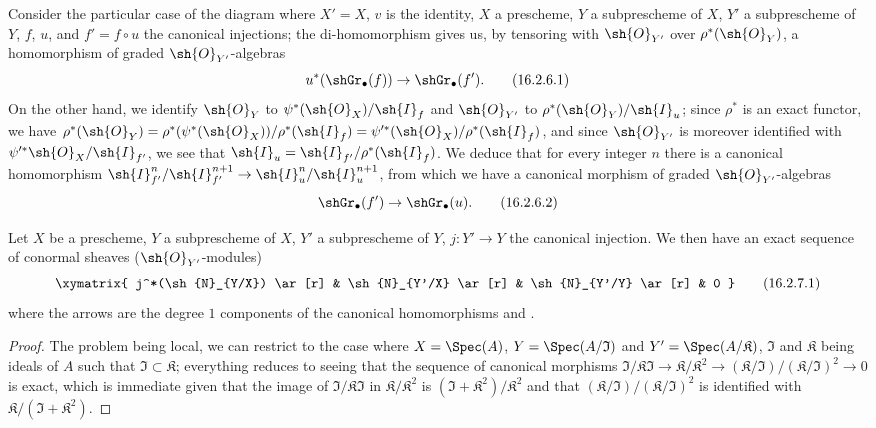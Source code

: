 \begin{env}[16.2.6]
\label{IV.16.2.6}
Consider the particular case of the diagram  where $X' = X$, $v$ is the identity, $X$ a prescheme, $Y$ a subprescheme of $X$, $Y'$ a subprescheme of $Y$, $f$, $u$, and $f' = f \circ u$ the canonical injections;
the di-homomorphism  gives us, by tensoring with $\sh{O}_{Y'}$ over $\rho^*(\sh{O}_Y)$, a homomorphism of graded $\sh{O}_{Y'}$-algebras
\[
  \label{IV.16.2.6.1}
  u^*(\shGr_\bullet(f)) \to \shGr_\bullet(f').
  \tag{16.2.6.1}
\]
On the other hand, we identify $\sh{O}_Y$ to $\psi^*(\sh{O}_X)/\sh{I}_f$ and $\sh{O}_{Y'}$ to $\rho^*(\sh{O}_Y)/\sh{I}_u$;
since $\rho^*$ is an exact functor, we have $\rho^*(\sh{O}_Y) = \rho^*(\psi^*(\sh{O}_X))/\rho^*(\sh{I}_f) = \psi'^*(\sh{O}_X)/\rho^*(\sh{I}_f)$, and since $\sh{O}_{Y'}$ is moreover identified with $\psi'^*{\sh{O}_X}/\sh{I}_{f'}$, we see that $\sh{I}_u = \sh{I}_{f'}/\rho^*(\sh{I}_f)$.
We deduce that for every integer $n$ there is a canonical homomorphism $\sh{I}_{f'}^n/\sh{I}_{f'}^{n+1} \to \sh{I}_{u}^n/\sh{I}_{u}^{n+1}$, from which we have a canonical morphism of graded $\sh{O}_{Y'}$-algebras
\[
  \label{IV.16.2.6.2}
  \shGr_\bullet(f') \to \shGr_\bullet(u).
  \tag{16.2.6.2}
\]
\end{env}

\begin{proposition}[16.2.7]
\label{IV.16.2.7}
Let $X$ be a prescheme, $Y$ a subprescheme of $X$, $Y'$ a subprescheme of $Y$, $j:Y' \to Y$ the canonical injection.
We then have an exact sequence of conormal sheaves ($\sh{O}_{Y'}$-modules)
\[
  \label{IV.16.2.7.1}
  \xymatrix{
    j^*(\sh{N}_{Y/X}) \ar[r] & \sh{N}_{Y'/X} \ar[r] & \sh{N}_{Y'/Y} \ar[r] & 0
  }
  \tag{16.2.7.1}
\]
where the arrows are the degree $1$ components of the canonical homomorphisms  and .
\end{proposition}

\begin{proof}
The problem being local, we can restrict to the case where $X = \Spec(A)$, $Y = \Spec(A/\mathfrak{I})$ and $Y' = \Spec(A/\mathfrak{K})$, $\mathfrak{I}$ and $\mathfrak{K}$ being ideals of $A$ such that $\mathfrak{I} \subset \mathfrak{K}$;
everything reduces to seeing 
that the sequence of canonical morphisms $\mathfrak{I}/\mathfrak{K}\mathfrak{I} \to \mathfrak{K}/\mathfrak{K}^2 \to (\mathfrak{K}/\mathfrak{I})/(\mathfrak{K}/\mathfrak{I})^2 \to 0$ is exact, which is immediate given that the image of $\mathfrak{I}/\mathfrak{K}\mathfrak{I}$ in $\mathfrak{K}/\mathfrak{K}^2$ is $(\mathfrak{I} + \mathfrak{K}^2)/\mathfrak{K}^2$ and that $(\mathfrak{K}/\mathfrak{I})/(\mathfrak{K}/\mathfrak{I})^2$ is identified with $\mathfrak{K}/(\mathfrak{I} + \mathfrak{K}^2)$.
\end{proof}

